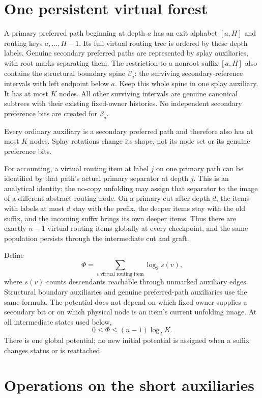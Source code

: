 \documentclass[11pt]{article}
\begin{document}
\section*{One persistent virtual forest}

A primary preferred path beginning at depth $a$ has an exit alphabet
$[a,H]$ and routing keys $a,\ldots,H-1$. Its full virtual routing tree
is ordered by these depth labels. Genuine secondary preferred paths
are represented by splay auxiliaries, with root marks separating them.
The restriction to a nonroot suffix $[a,H]$ also contains the structural
boundary spine $\beta_a$: the surviving secondary-reference intervals
with left endpoint below $a$. Keep this whole spine in one splay
auxiliary. It has at most $K$ nodes. All other surviving intervals are
genuine canonical subtrees with their existing fixed-owner histories.
No independent secondary preference bits are created for $\beta_a$.

Every ordinary auxiliary is a secondary preferred path and therefore
also has at most $K$ nodes. Splay rotations change its shape, not its
node set or its genuine preference bits.

For accounting, a virtual routing item at label $j$ on one primary
path can be identified by that path's actual primary separator at
depth $j$. This is an analytical identity; the no-copy unfolding may
assign that separator to the image of a different abstract routing
node. On a primary cut after depth $d$, the items with labels at most
$d$ stay with the prefix, the deeper items stay with the old suffix,
and the incoming suffix brings its own deeper items. Thus there are
exactly $n-1$ virtual routing items globally at every checkpoint, and
the same population persists through the intermediate cut and graft.

Define
\[
 \Phi=\sum_{v\ \text{virtual routing item}}\log_2 s(v),
\]
where $s(v)$ counts descendants reachable through unmarked auxiliary
edges. Structural boundary auxiliaries and genuine preferred-path
auxiliaries use the same formula. The potential does not depend on
which fixed owner supplies a secondary bit or on which physical node
is an item's current unfolding image. At all intermediate states used
below,
\[
 0\le\Phi\le(n-1)\log_2 K.                    \tag{1}
\]
There is one global potential; no new initial potential is assigned
when a suffix changes status or is reattached.

\section*{Operations on the short auxiliaries}
\end{document}
